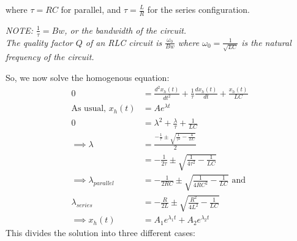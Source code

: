 \documentclass[nobib]{tufte-handout}
\begin{document}
where $\tau = RC$ for parallel, and $\tau = \frac{L}{R}$ for the series configuration.\\
\begin{center}
    \textit{NOTE: $\frac{1}{\tau} = Bw$, or the bandwidth of the circuit.\\ The quality factor $Q$ of an RLC circuit is $\frac{\omega_0}{Bw}$ where $\omega_0=\frac{1}{\sqrt{LC}}$ is the natural frequency of the circuit.}\\
\end{center}
So, we now solve the homogenous equation:
\begin{align*}
    0                           & = \frac{d^2x_h(t)}{dt^2}+\frac{1}{\tau}\frac{dx_h(t)}{dt}+\frac{x_h(t)}{LC} \\
    \text{As usual, } x_h(t)    & = Ae^{\lambda t}                                                            \\
    0                           & = \lambda^2+\frac{\lambda}{\tau}+\frac{1}{LC}                               \\
    \implies \lambda            & = \frac{-\frac{1}{\tau}\pm \sqrt{\frac{1}{\tau^2}-\frac{4}{LC}}}{2}         \\
                                & = -\frac{1}{2\tau} \pm \sqrt{\frac{1}{4\tau^2}-\frac{1}{LC}}                \\
    \implies \lambda_{parallel} & = -\frac{1}{2RC} \pm \sqrt{\frac{1}{4RC^2}-\frac{1}{LC}}\text{ and}         \\
    \lambda_{series}            & = -\frac{R}{2L} \pm \sqrt{\frac{R^2}{4L^2}-\frac{1}{LC}}                    \\
    \implies x_h(t)             & = A_1e^{\lambda_1t}+A_2e^{\lambda_2t}
\end{align*}
This divides the solution into three different cases:
\end{document}
